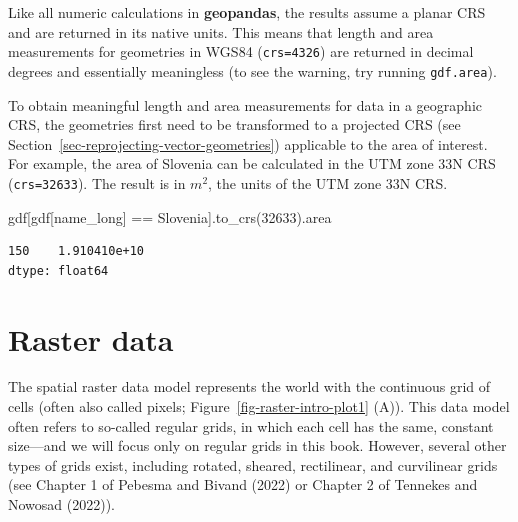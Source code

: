 \documentclass[
  letterpaper,
]{krantz}
\newenvironment{Shaded}{\begin{snugshade}}{\end{snugshade}}
\newcommand{\DecValTok}[1]{\textcolor[rgb]{0.68,0.00,0.00}{#1}}
\newcommand{\NormalTok}[1]{\textcolor[rgb]{0.00,0.23,0.31}{#1}}
\newcommand{\OperatorTok}[1]{\textcolor[rgb]{0.37,0.37,0.37}{#1}}
\newcommand{\StringTok}[1]{\textcolor[rgb]{0.13,0.47,0.30}{#1}}
\begin{document}
Like all numeric calculations in \textbf{geopandas}, the results assume
a planar CRS and are returned in its native units. This means that
length and area measurements for geometries in WGS84 (\texttt{crs=4326})
are returned in decimal degrees and essentially meaningless (to see the
warning, try running \texttt{gdf.area}).

To obtain meaningful length and area measurements for data in a
geographic CRS, the geometries first need to be transformed to a
projected CRS (see Section~\ref{sec-reprojecting-vector-geometries})
applicable to the area of interest. For example, the area of Slovenia
can be calculated in the UTM zone 33N CRS (\texttt{crs=32633}). The
result is in \(m^2\), the units of the UTM zone 33N CRS.

\begin{Shaded}
\begin{Highlighting}[]
\NormalTok{gdf[gdf[}\StringTok{\textquotesingle{}name\_long\textquotesingle{}}\NormalTok{] }\OperatorTok{==} \StringTok{\textquotesingle{}Slovenia\textquotesingle{}}\NormalTok{].to\_crs(}\DecValTok{32633}\NormalTok{).area}
\end{Highlighting}
\end{Shaded}

\begin{verbatim}
150    1.910410e+10
dtype: float64
\end{verbatim}

\section{Raster data}\label{sec-raster-data}

The spatial raster data model represents the world with the continuous
grid of cells (often also called pixels;
Figure~\ref{fig-raster-intro-plot1} (A)). This data model often refers
to so-called regular grids, in which each cell has the same, constant
size---and we will focus only on regular grids in this book. However,
several other types of grids exist, including rotated, sheared,
rectilinear, and curvilinear grids (see Chapter 1 of Pebesma and Bivand
(2022) or Chapter 2 of Tennekes and Nowosad (2022)).
\end{document}
